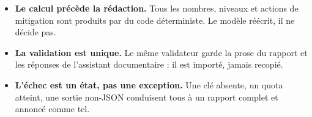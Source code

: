 \begin{itemize}
  \item \textbf{Le calcul précède la rédaction.} Tous les nombres, niveaux et
    actions de mitigation sont produits par du code déterministe. Le modèle
    réécrit, il ne décide pas.
  \item \textbf{La validation est unique.} Le même validateur garde la prose du
    rapport et les réponses de l'assistant documentaire : il est importé, jamais
    recopié.
  \item \textbf{L'échec est un état, pas une exception.} Une clé absente, un
    quota atteint, une sortie non-JSON conduisent tous à un rapport complet et
    annoncé comme tel.
\end{itemize}
